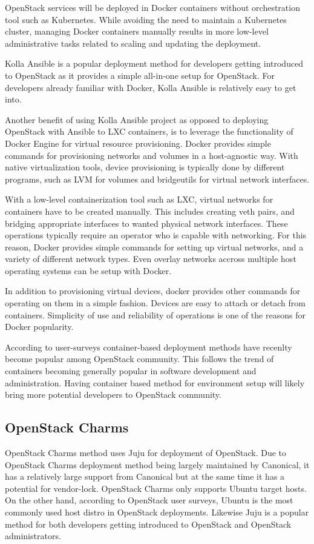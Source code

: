 OpenStack services will be deployed in Docker containers without orchestration
tool such as Kubernetes. While avoiding the need to maintain a Kubernetes
cluster, managing Docker containers manually results in more low-level
administrative tasks related to scaling and updating the deployment.

Kolla Ansible is a popular deployment method for developers getting introduced
to OpenStack as it provides a simple all-in-one setup for OpenStack. For
developers already familiar with Docker, Kolla Ansible is relatively easy to
get into.

Another benefit of using Kolla Ansible project as opposed to deploying
OpenStack with Ansible to LXC containers, is to leverage the functionality of
Docker Engine for virtual resource provisioning. Docker provides simple
commands for provisioning networks and volumes in a host-agnostic way. With
native virtualization tools, device provisioning is typically done by different
programs, such as LVM for volumes and bridgeutils for virtual network
interfaces.

With a low-level containerization tool such as LXC, virtual networks for
containers have to be created manually. This includes creating veth pairs, and
bridging appropriate interfaces to wanted physical network interfaces. These
operations typically require an operator who is capable with networking. For
this reason, Docker provides simple commands for setting up virtual networks,
and a variety of different network types. Even overlay networks accross
multiple host operating systems can be setup with Docker.

In addition to provisioning virtual devices, docker provides other commands for
operating on them in a simple fashion. Devices are easy to attach or detach
from containers. Simplicity of use and reliability of operations is one of the
reasons for Docker popularity.

According to user-surveys container-based deployment methods have recenlty
become popular among OpenStack community. This follows the trend of containers
becoming generally popular in software development and administration. Having
container based method for environment setup will likely bring more potential
developers to OpenStack community.

\subsection{OpenStack Charms}

OpenStack Charms \cite{charm-deployment-guide} method uses Juju for deployment
of OpenStack. Due to OpenStack Charms deployment method being largely
maintained by Canonical, it has a relatively large support from Canonical but
at the same time it has a potential for vendor-lock. OpenStack Charms only
supports Ubuntu target hosts. On the other hand, according to OpenStack user
surveys, Ubuntu is the most commonly used host distro in OpenStack deployments.
Likewise Juju is a popular method for both developers getting introduced to
OpenStack and OpenStack administrators.

